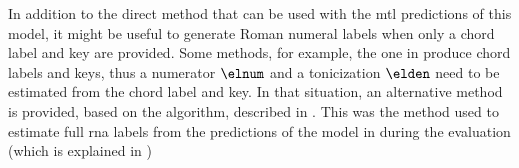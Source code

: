 
In addition to the direct method that can be used with the
\gls{mtl} predictions of this model, it might be useful to
generate Roman numeral labels when only a chord label and
key are provided. Some methods, for example, the one in
\textcite{mcleod2021modular} produce chord labels and keys,
thus a numerator $\elnum$ and a tonicization $\elden$ need
to be estimated from the chord label and key. In that
situation, an alternative method is provided, based on the
\algorithmrn{} algorithm, described in
.
This was the method used to estimate full \gls{rna} labels
from the predictions of the model in
\textcite{mcleod2021modular, chen2021attend} during the
evaluation (which is explained in
)


